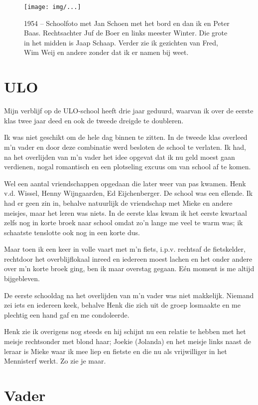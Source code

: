 \documentclass[10pt,twoside,openright]{memoir}
\begin{document}
\begin{figure}[t]
\texttt{[image: img/...]}
\caption{1954 – Schoolfoto met Jan Schoen met het bord en dan ik en Peter Baas. Rechtsachter Juf de Boer en links meester Winter. Die grote in het midden is Jaap Schaap. Verder zie ik gezichten van Fred, Wim Weij en andere zonder dat ik er namen bij weet.}
\end{figure}

\chapter{ULO} %
\label{cha:ulo}

Mijn verblijf op de ULO-school heeft drie jaar geduurd, waarvan ik over de eerste klas twee jaar deed en ook de tweede dreigde te doubleren. 

Ik was niet geschikt om de hele dag binnen te zitten. In de tweede klas overleed m’n vader en door deze combinatie werd besloten de school te verlaten. Ik had, na het overlijden van m’n vader het idee opgevat dat ik nu geld moest gaan verdienen, nogal romantisch en een plotseling excuus om van school af te komen. 

Wel een aantal vriendschappen opgedaan die later weer van pas kwamen. Henk v.d. Wissel, Henny Wijngaarden, Ed Eijchenberger. De school was een ellende. Ik had er geen zin in, behalve natuurlijk de vriendschap met Mieke en andere meisjes, maar het leren was niets. In de eerste klas kwam ik het eerste kwartaal zelfs nog in korte broek naar school omdat zo’n lange me veel te warm was; ik schaatste tenslotte ook nog in een korte dus. 

Maar toen ik een keer in volle vaart met m’n fiets, i.p.v. rechtsaf de fietskelder, rechtdoor het overblijflokaal inreed en iedereen moest lachen en het onder andere over m’n korte broek ging, ben ik maar overstag gegaan. Eén moment is me altijd bijgebleven. 

De eerste schooldag na het overlijden van m’n vader was niet makkelijk. Niemand zei iets en iedereen keek, behalve Henk die zich uit de groep losmaakte en me plechtig een hand gaf en me condoleerde. 

Henk zie ik overigens nog steeds en hij schijnt nu een relatie te hebben met het meisje rechtsonder met blond haar; Joekie (Jolanda) en het meisje links naast de leraar is Mieke waar ik mee liep en fietste en die nu als vrijwilliger in het Mennisterf werkt. Zo zie je maar.

\chapter{Vader} %
\label{cha:vader}
\end{document}
